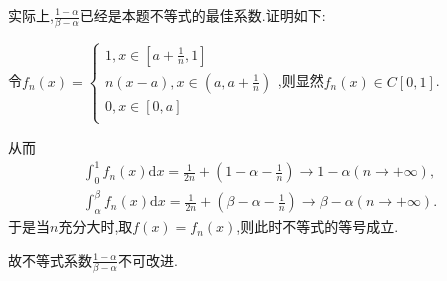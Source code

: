 \documentclass[lang=cn,newtx,10pt,scheme=chinese]{../Template/elegantbook}
\begin{document}
\begin{remark}
实际上,$\frac{1-\alpha}{\beta -\alpha}$已经是本题不等式的最佳系数.证明如下:

令$f_n\left( x \right) =\begin{cases}
1,x\in \left[ a+\frac{1}{n},1 \right]\\
n\left( x-a \right) ,x\in \left( a,a+\frac{1}{n} \right)\\
0,x\in \left[ 0,a \right]\\
\end{cases}$,则显然$f_n(x)\in C[0,1]$.

从而
\begin{align*}
\int_0^1{f_n\left( x \right) \mathrm{d}x}=\frac{1}{2n}+\left( 1-\alpha -\frac{1}{n} \right) \rightarrow 1-\alpha \left( n\rightarrow +\infty \right) ,
\\
\int_{\alpha}^{\beta}{f_n\left( x \right) \mathrm{d}x}=\frac{1}{2n}+\left( \beta -\alpha -\frac{1}{n} \right) \rightarrow \beta -\alpha \left( n\rightarrow +\infty \right) .
\nonumber
\end{align*}
于是当$n$充分大时,取$f(x)=f_n(x)$,则此时不等式的等号成立.

故不等式系数$\frac{1-\alpha}{\beta -\alpha}$不可改进.
\end{remark}
\end{document}
